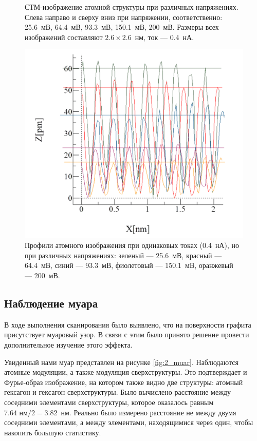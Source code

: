 \documentclass[a4paper, 12pt]{article}
\begin{document}
\begin{figure}[H]
		\caption{СТМ-изображение атомной структуры при различных напряжениях. Слева направо и сверху вниз при напряжении, соответственно: 25.6~мВ, 64.4~мВ, 93.3~мВ, 150.1~мВ, 200~мВ. Размеры всех изображений составляют $2.6\times2.6$~нм, ток --- 0.4~нА.}
		\label{fig:2_different_volt}
	\end{figure}

	\begin{figure}[H]
		\centering
		\includegraphics[width=0.9\linewidth]{../STM_data/STM_Profiles/Graphs/All_graphs}
		\caption{Профили атомного изображения при одинаковых токах (0.4~нА), но при различных напряжениях: зеленый --- 25.6~мВ, красный --- 64.4~мВ, синий --- 93.3~мВ, фиолетовый --- 150.1~мВ, оранжевый --- 200~мВ.}
		\label{fig:2_different_volt_profiles}
	\end{figure}


	
	\subsection{Наблюдение муара}
	
	В ходе выполнения сканирования было выявлено, что на поверхности графита присутствует муаровый узор. В связи с этим было принято решение провести дополнительное изучение этого эффекта.
	
	Увиденный нами муар представлен на рисунке \ref{fig:2_muar}. Наблюдаются атомные модуляции, а также модуляция сверхструктуры. Это подтверждает и Фурье-образ изображение, на котором также видно две структуры: атомный гексагон и гексагон сверхструктуры. Было вычислено расстояние между соседними элементами сверхструктуры, которое оказалось равным $7.64\text{ нм}/2 = 3.82$~нм. Реально было измерено расстояние не между двумя соседними элементами, а между элементами, находящимися через один, чтобы накопить большую статистику.
	
\end{document}
